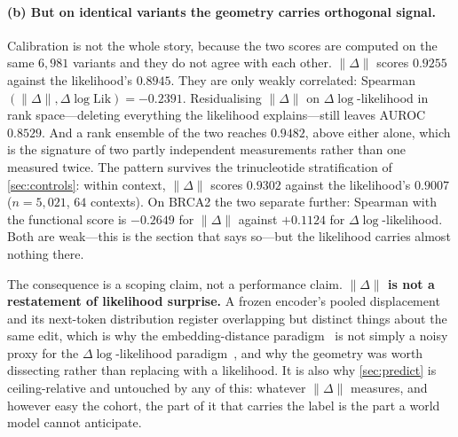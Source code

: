 \documentclass{article}
\newcommand{\D}{\Delta}
\begin{document}
\paragraph{(b) But on identical variants the geometry carries orthogonal signal.} Calibration is not
the whole story, because the two scores are computed on the same $6{,}981$ variants and they do not
agree with each other. $\lVert\D\rVert$ scores $0.9255$ against the likelihood's $0.8945$. They are
only weakly correlated: Spearman$(\lVert\D\rVert,\Delta\log\mathrm{Lik}) = -0.2391$. Residualising
$\lVert\D\rVert$ on $\Delta\log$-likelihood in rank space---deleting everything the likelihood
explains---still leaves AUROC $0.8529$. And a rank ensemble of the two reaches $0.9482$, above
either alone, which is the signature of two partly independent measurements rather than one measured
twice. The pattern survives the trinucleotide stratification of \cref{sec:controls}: within context,
$\lVert\D\rVert$ scores $0.9302$ against the likelihood's $0.9007$ ($n{=}5{,}021$, $64$ contexts).
On BRCA2 the two separate further: Spearman with the functional score is $-0.2649$ for
$\lVert\D\rVert$ against $+0.1124$ for $\Delta\log$-likelihood. Both are weak---this is the section
that says so---but the likelihood carries almost nothing there.

The consequence is a scoping claim, not a performance claim. \textbf{$\lVert\D\rVert$ is not a
restatement of likelihood surprise.} A frozen encoder's pooled displacement and its next-token
distribution register overlapping but distinct things about the same edit, which is why the
embedding-distance paradigm~\citep{bend2024} is not simply a noisy proxy for the
$\Delta\log$-likelihood paradigm~\citep{esm1v2021,gpn2023,evo2024}, and why the geometry was worth
dissecting rather than replacing with a likelihood. It is also why \cref{sec:predict} is
ceiling-relative and untouched by any of this: whatever $\lVert\D\rVert$ measures, and however easy
the cohort, the part of it that carries the label is the part a world model cannot anticipate.
\end{document}

